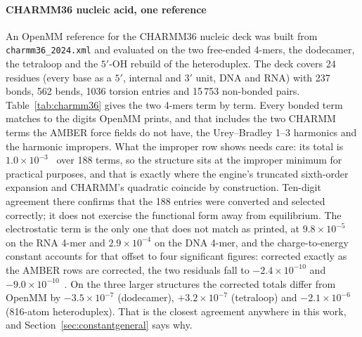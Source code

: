 \paragraph{CHARMM36 nucleic acid, one reference}
An OpenMM reference for the CHARMM36 nucleic deck was built from
\texttt{charmm36\_2024.xml} and evaluated on the two free-ended 4-mers, the
dodecamer, the tetraloop and the $5'$-OH rebuild of the heteroduplex. The deck
covers 24 residues (every base as a $5'$, internal and $3'$ unit, DNA and RNA)
with 237 bonds, 562 bends, 1036 torsion entries and 15\,753 non-bonded pairs.
Table~\ref{tab:charmm36} gives the two 4-mers term by term. Every bonded term
matches to the digits OpenMM prints, and that includes the two CHARMM terms the
AMBER force fields do not have, the Urey--Bradley 1--3 harmonics and the
harmonic impropers. What the improper row shows needs care: its total is
$1.0\times10^{-3}$~\kcal{} over 188 terms, so the structure sits at the improper
minimum for practical purposes, and that is exactly where the engine's truncated
sixth-order expansion and CHARMM's quadratic coincide by construction.
Ten-digit agreement there confirms that the 188 entries were converted and
selected correctly; it does not exercise the functional form away from
equilibrium. The electrostatic term is the only one that does not match as
printed, at $9.8\times10^{-5}$~\kcal{} on the RNA 4-mer and $2.9\times10^{-4}$
on the DNA 4-mer, and the charge-to-energy constant accounts for that offset to
four significant figures: corrected exactly as the AMBER rows are corrected, the
two residuals fall to $-2.4\times10^{-10}$ and $-9.0\times10^{-10}$~\kcal{}. On
the three larger structures the corrected totals differ from OpenMM by
$-3.5\times10^{-7}$ (dodecamer), $+3.2\times10^{-7}$ (tetraloop) and
$-2.1\times10^{-6}$~\kcal{} (816-atom heteroduplex). That is the closest
agreement anywhere in this work, and Section~\ref{sec:constantgeneral} says
why.

